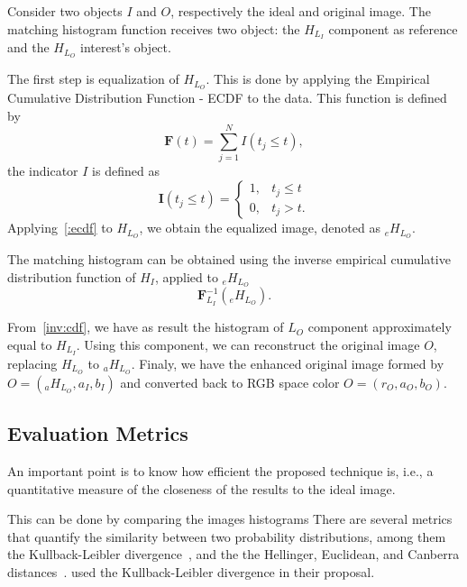 \documentclass{article}
\begin{document}
Consider two objects $I$ and $O$, respectively the ideal and original image.
The matching histogram function receives two object: the $H_{L_I}$ component as reference and the $H_{L_O}$ interest's object. 

The first step is equalization of $H_{L_O}$. 
This is done by applying the Empirical Cumulative Distribution Function - ECDF to the data.
This function is defined by 
\begin{equation}
    \bm F(t) = \sum_{j=1}^N I(t_j \leq t) ,
    \label{eq:ecdf}
\end{equation}
the indicator $I$ is defined as
\begin{equation}
    \bm I(t_j \leq t) = \begin{cases}
        1,  & t_j \leq t \\
        0,  & t_j > t.
    \end{cases}
\end{equation}
Applying~\eqref{:ecdf} to $H_{L_O}$, we obtain the equalized image, denoted as $_eH_{L_O}$. 

The matching histogram can be obtained using the inverse empirical cumulative distribution function of $H_I$, applied to $_eH_{L_O}$
\begin{equation}
    \bm F^{-1}_{L_I}(_eH_{L_O}).
    \label{inv:cdf}
\end{equation}

From~\eqref{inv:cdf}, we have as result the histogram of $L_O$ component approximately equal to $H_{L_I}$. 
Using this component, we can reconstruct the original image $O$, replacing $H_{L_O}$ to $_aH_{L_O}$. 
Finaly, we have the enhanced original image formed by $O = (_aH_{L_O}, a_I, b_I)$ and converted back to RGB space color $O = (r_O, a_O, b_O)$.

\subsection{Evaluation Metrics}

An important point is to know how efficient the proposed technique is, i.e., a quantitative measure of the closeness of the results to the ideal image. 

This can be done by comparing the images histograms
There are several metrics that quantify the similarity between two probability distributions, among them the Kullback-Leibler divergence~\citep{AssessingInformationContentinColorImages}, and the
the Hellinger, 
Euclidean, and Canberra distances~\citep{BanchmarckSimiliraty}.
\citet{AssessingInformationContentinColorImages} used the Kullback-Leibler divergence in their proposal.
\end{document}
